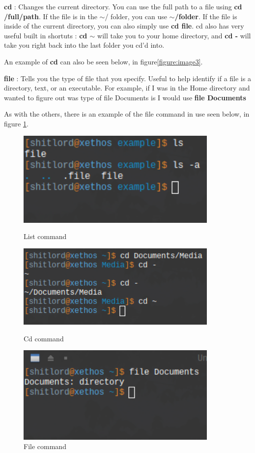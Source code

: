 \documentclass[12pt, letterpaper, twoside]{article}
\begin{document}
\textbf{cd} : Changes the current directory. You can use the full path to a file using \textbf{cd /full/path}. If the file is in the $\mathtt{\sim}$/ folder, you can use \textbf{$\mathtt{\sim}$/folder}. If the file is inside of the current directory, you can also simply use \textbf{cd file}. cd also has very useful built in shortuts : \textbf{cd $\mathtt{\sim}$} will take you to your home directory, and \textbf{cd -} will take you right back into the last folder you cd'd into. 

An example of \textbf{cd} can also be seen below, in figure\ref{figure:image3}.

\textbf{file} : Tells you the type of file that you specify. Useful to help identify if a file is a directory, text, or an executable. For example, if I was in the Home directory and wanted to figure out was type of file Documents is I would use \textbf{file Documents}

As with the others, there is an example of the file command in use seen below, in figure \ref{figure:image4}.

\begin{figure}[!htb]
  \includegraphics[width=0.88\textwidth]{listfile}
  \caption{List command}\label{figure:image2}
\endminipage\hfill
{}
  \includegraphics[width=0.88\textwidth]{cddemo}
  \caption{Cd command}\label{figure:image3}
\endminipage\hfill
{}%
  \includegraphics[width=0.88\textwidth]{filecmd}
  \caption{File command}\label{figure:image4}
\endminipage
\end{figure}
\end{document}
